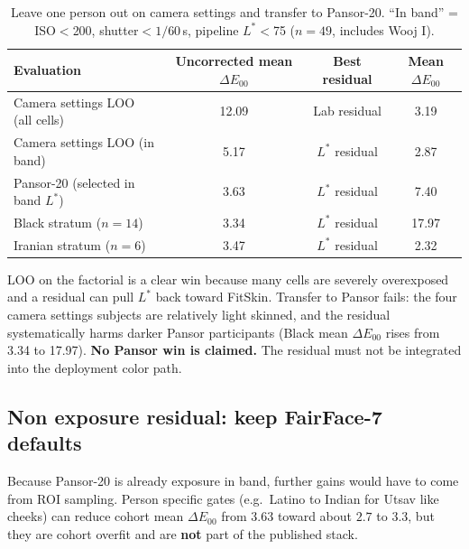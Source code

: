 \documentclass[11pt]{article}
\newcommand{\deee}{\ensuremath{\Delta E_{00}}}
\begin{document}
\begin{table}[t]
\centering
\caption{Leave one person out on camera settings and transfer to Pansor-20.
``In band'' = ISO$<$200, shutter$< 1/60$\,s, pipeline $L^*<$75 ($n=49$, includes Wooj I).}
\label{tab:residual}
\begin{tabular}{@{}lccc@{}}
\toprule
Evaluation & Uncorrected mean $\deee$ & Best residual & Mean $\deee$ \\
\midrule
Camera settings LOO (all cells) & \num{12.09} & Lab residual & \num{3.19} \\
Camera settings LOO (in band) & \num{5.17} & $L^*$ residual & \num{2.87} \\
Pansor-20 (selected in band $L^*$) & \num{3.63} & $L^*$ residual & \num{7.40} \\
\quad Black stratum ($n=14$) & \num{3.34} & $L^*$ residual & \num{17.97} \\
\quad Iranian stratum ($n=6$) & \num{3.47} & $L^*$ residual & \num{2.32} \\
\bottomrule
\end{tabular}
\end{table}

LOO on the factorial is a clear win because many cells are severely overexposed and a residual can pull $L^*$ back toward FitSkin.
Transfer to Pansor fails: the four camera settings subjects are relatively light skinned, and the residual systematically harms darker Pansor participants (Black mean $\deee$ rises from \num{3.34} to \num{17.97}).
\textbf{No Pansor win is claimed.} The residual must not be integrated into the deployment color path.

\subsection{Non exposure residual: keep FairFace-7 defaults}
\label{sec:roi-honesty}
Because Pansor-20 is already exposure in band, further gains would have to come from ROI sampling.
Person specific gates (e.g.\ Latino to Indian for Utsav like cheeks) can reduce cohort mean $\deee$ from \num{3.63} toward about $2.7$ to $3.3$, but they are cohort overfit and are \textbf{not} part of the published stack.
\end{document}
